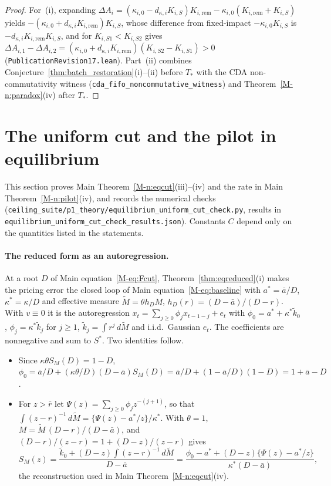 \documentclass[12pt]{article}
\theoremstyle{definition}
\theoremstyle{remark}
\begin{document}
\begin{proof}
For~(i), expanding $\Delta A_i = (\kappa_{i,0} - d_{\kappa,i} K_{i,S}) K_{i,\mathrm{rem}} - \kappa_{i,0}(K_{i,\mathrm{rem}} + K_{i,S})$ yields $-(\kappa_{i,0} + d_{\kappa,i} K_{i,\mathrm{rem}})K_{i,S}$, whose difference from fixed-impact $-\kappa_{i,0}K_{i,S}$ is $-d_{\kappa,i} K_{i,\mathrm{rem}} K_{i,S}$, and for $K_{i,S1} < K_{i,S2}$ gives $\Delta A_{i,1} - \Delta A_{i,2} = (\kappa_{i,0} + d_{\kappa,i} K_{i,\mathrm{rem}})(K_{i,S2} - K_{i,S1}) > 0$ (\nolinkurl{PublicationRevision17.lean}). Part~(ii) combines Conjecture~\ref{thm:batch_restoration}(i)--(ii) before $T_*$ with the CDA non-commutativity witness (\texttt{cda\_fifo\_noncommutative\_witness}) and Theorem~\ref{M-n:paradox}(iv) after $T_*$.
\end{proof}



\section{The uniform cut and the pilot in equilibrium}\label{sec:eqcut}

This section proves Main Theorem~\ref{M-n:eqcut}(iii)--(iv) and the rate in Main Theorem~\ref{M-n:pilot}(iv), and records the numerical checks (\nolinkurl{ceiling_suite/p1_theory/equilibrium_uniform_cut_check.py}, results in \nolinkurl{equilibrium_uniform_cut_check_results.json}). Constants $C$ depend only on the quantities listed in the statements.

\paragraph{The reduced form as an autoregression.} At a root $D$ of Main equation~\eqref{M-eq:Fcut}, Theorem~\ref{thm:eqreduced}(i) makes the pricing error the closed loop of Main equation~\eqref{M-eq:baseline} with $a^* = \bar a/D$, $\kappa^* = \kappa/D$ and effective measure $\tilde M = \theta h_D M$, $h_D(r) = (D - \bar a)/(D - r)$. With $v \equiv 0$ it is the autoregression $x_t = \sum_{j \ge 0} \phi_j x_{t-1-j} + e_t$ with $\phi_0 = a^* + \kappa^* \tilde k_0$, $\phi_j = \kappa^* \tilde k_j$ for $j \ge 1$, $\tilde k_j = \int r^j\, d\tilde M$ and i.i.d.\ Gaussian $e_t$. The coefficients are nonnegative and sum to $S^*$. Two identities follow.
\begin{itemize}[itemsep=1pt,topsep=2pt]
\item Since $\kappa\theta S_M(D) = 1 - D$, $\phi_0 = \bar a/D + (\kappa\theta/D)(D - \bar a)S_M(D) = \bar a/D + (1 - \bar a/D)(1 - D) = 1 + \bar a - D$.
\item For $z > \bar r$ let $\Psi(z) = \sum_{j \ge 0} \phi_j z^{-(j+1)}$, so that $\int (z - r)^{-1}\, d\tilde M = \{\Psi(z) - a^*/z\}/\kappa^*$. With $\theta = 1$, $M = \tilde M\,(D - r)/(D - \bar a)$, and $(D - r)/(z - r) = 1 + (D - z)/(z - r)$ gives
\begin{equation}\label{eq:SMfromphi}
  S_M(z) = \frac{\tilde k_0 + (D - z)\int (z - r)^{-1}\, d\tilde M}{D - \bar a} = \frac{\phi_0 - a^* + (D - z)\{\Psi(z) - a^*/z\}}{\kappa^*(D - \bar a)},
\end{equation}
the reconstruction used in Main Theorem~\ref{M-n:eqcut}(iv).
\end{itemize}
\end{document}
